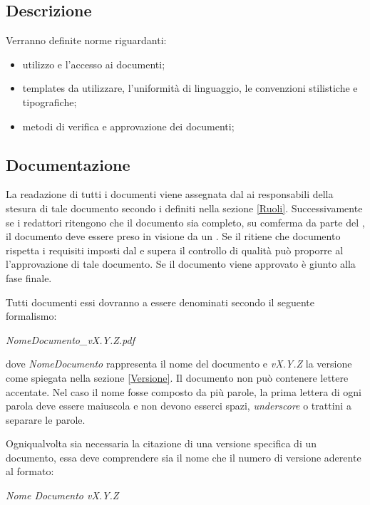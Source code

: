 \documentclass[12pt,a4paper]{article}
\begin{document}
\subsection{Descrizione}
Verranno definite norme riguardanti:
\begin{itemize}
  \item utilizzo e l'accesso ai documenti;
  \item templates da utilizzare, l'uniformità di linguaggio, le convenzioni stilistiche e tipografiche;
  \item metodi di verifica e approvazione dei documenti;
\end{itemize}

\subsection{Documentazione}\label{Documentazione} %
La readazione di tutti i documenti viene assegnata dal \PM{} ai responsabili della stesura di tale documento secondo i  definiti nella sezione \ref{Ruoli}. Successivamente se i redattori ritengono che il documento sia completo, su comferma da parte del \PM, il documento deve essere preso in visione da un \VR. Se il \VR ritiene che documento rispetta i requisiti imposti dal \PR{} e supera il controllo di qualità può proporre al \PM{} l'approvazione di tale documento. Se il documento viene approvato è giunto alla fase finale.

Tutti documenti essi dovranno a essere denominati secondo il seguente formalismo:
\begin{center}
\emph{NomeDocumento\_vX.Y.Z.pdf}
\end{center}
dove \emph{NomeDocumento} rappresenta il nome del documento e \emph{vX.Y.Z} la versione come spiegata nella sezione \ref{Versione}. Il documento non può contenere lettere accentate. Nel caso il nome fosse composto da più parole, la prima lettera di ogni parola deve essere maiuscola e non devono esserci spazi, \emph{underscore} o trattini a separare le parole.

Ogniqualvolta sia necessaria la citazione di una versione specifica di un documento, essa deve comprendere sia il nome che il numero di versione aderente al formato:
\begin{center}
\emph{Nome Documento vX.Y.Z}
\end{center}
\end{document}
